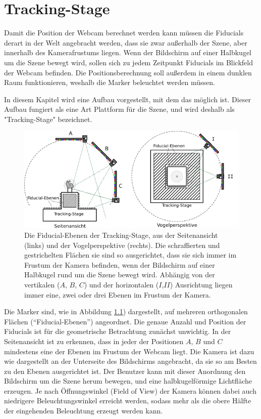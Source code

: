 \chapter{Tracking-Stage}  \label{position}
   
   Damit die Position der Webcam berechnet werden kann müssen die Fiducials derart in der Welt angebracht werden, dass sie zwar außerhalb der Szene, aber innerhalb des Kamerafrustums liegen.
   Wenn der Bildschirm auf einer Halbkugel um die Szene bewegt wird, sollen sich zu jedem Zeitpunkt Fiducials im Blickfeld der Webcam befinden.
   Die Positionsberechnung soll außerdem in einem dunklen Raum funktionieren, weshalb die Marker beleuchtet werden müssen.

   In diesem Kapitel wird eine Aufbau vorgestellt, mit dem das möglich ist.
   Dieser Aufbau fungiert als eine Art Plattform für die Szene, und wird deshalb als  "Tracking-Stage" bezeichnet.
   
       
   \begin{figure}[H]
    \centering
      \includegraphics[width=\textwidth]{../graphics/position/stage_views.svg}  

    \caption[Fiducial-Ebenen auf der Tracking-Stage]{Die Fiducial-Ebenen der Tracking-Stage, aus der Seitenansicht (links) und der Vogelperspektive (rechts). 
   Die schraffierten und gestrichelten Flächen sie sind so ausgerichtet, dass sie sich immer im Frustum der Kamera befinden, wenn der Bildschirm auf einer Halbkugel rund um die Szene bewegt wird.
    Abhängig von der vertikalen ($A$, $B$, $C$) und der horizontalen ($I$,$II$) Ausrichtung liegen immer eine, zwei oder drei Ebenen im Frustum der Kamera.
}
    \label{fig:stage_views}
   \end{figure}
 
   Die Marker sind, wie in Abbildung \ref{fig:stage_views}) dargestellt, auf mehreren orthogonalen Flächen (``Fiducial-Ebenen'') angeordnet.
   Die genaue Anzahl und Position der Fiducials ist für die geometrische Betrachtung zunächst unwichtig. 
   In der Seitenansicht ist zu erkennen, dass in jeder der Positionen $A$, $B$ und $C$ mindestens eine der Ebenen im Frustum der Webcam liegt.
   Die Kamera ist dazu wie dargestellt an der Unterseite des Bildschirms angebracht, da sie so am Besten zu den Ebenen ausgerichtet ist. 
   Der Benutzer kann mit dieser Anordnung den Bildschirm um die Szene herum bewegen, und eine halbkugelförmige Lichtfläche erzeugen. 
   Je nach Öffnungswinkel (Field of View) der Kamera können dabei auch niedrigere Beleuchtungswinkel erreicht werden, sodass mehr als die obere Hälfte der eingehenden Beleuchtung erzeugt werden kann.
   
